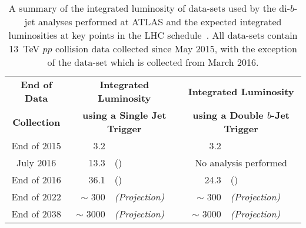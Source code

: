 {\renewcommand{\arraystretch}{1.2}
\begin{table}[!htb]
\centering
\begin{tabular}{|c|r l|r l|}
  \hline
\textbf{End of Data}       &  \multicolumn{2}{c|}{\textbf{Integrated Luminosity}}         &   \multicolumn{2}{c|}{\textbf{Integrated Luminosity}}           \\
\textbf{Collection}        &  \multicolumn{2}{c|}{\textbf{using a Single Jet Trigger}}    &   \multicolumn{2}{c|}{\textbf{using a Double $b$-Jet Trigger}}  \\
\hline                                                                    
End of 2015       &  3.2 \ifb{} & \cite{dibjet-mori16_paper}            &  3.2 \ifb{}           & \cite{dibjet-lhcp_conf}          \\
July  2016        & 13.3 \ifb{} & \cite{dibjet-ichep_conf} (\summer{})  &  \multicolumn{2}{c|}{No analysis performed}              \\
End of 2016       & 36.1 \ifb{} & \cite{dibjet-full} (\hm{})            &  24.3 \ifb{}          & \cite{dibjet-full} (\lm{})                          \\
End of 2022       & $\sim$ 300 \ifb{} &  \textit{(Projection)}          &  $\sim$ 300  \ifb{}   &  \textit{(Projection)}           \\
End of 2038       & $\sim$ 3000 \ifb{} & \textit{(Projection)}          &  $\sim$ 3000 \ifb{}   &  \textit{(Projection)}           \\
\hline
\end{tabular}
\caption[A summary of the integrated luminosity of data-sets used by the di-$b$-jet analyses performed at ATLAS and the expected integrated luminosities at key points in the LHC schedule]
        {A summary of the integrated luminosity of data-sets used by the di-$b$-jet analyses performed at ATLAS and the expected integrated luminosities at key points in the LHC schedule~\cite{fut-lhc-shedule}.
          All data-sets contain 13~TeV $pp$ collision data collected since May 2015,
          with the exception of the \lm{} data-set which is collected from March 2016.
        }
\label{tab:fut-lumi}
\end{table}}


